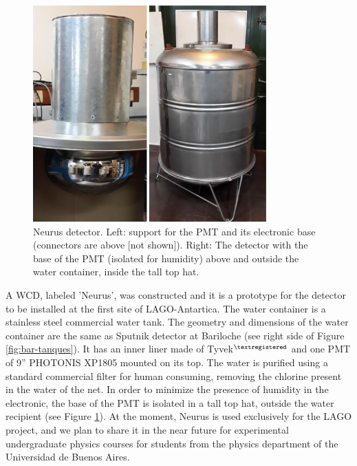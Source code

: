 \begin{figure}[h!]
\begin{center}
\includegraphics[width=0.8\textwidth]{images/argentina/neurus.png}
\caption{Neurus detector. Left: support for the PMT and its electronic base
(connectors are above [not shown]). Right: The detector with the base of the
PMT (isolated for humidity) above and outside the water container, inside the
tall top hat.}
\label{fig:neurus}
 \end{center}
\end{figure}

A WCD, labeled 'Neurus', was constructed and it is a prototype for the detector
to be installed at the first site of LAGO-Antartica.  The water container is a
stainless steel commercial water tank.  The geometry and dimensions of the
water container are the same as Sputnik detector at Bariloche (see right side
of Figure \ref{fig:bar-tanques}).  It has an inner liner made of
Tyvek$^{\textregistered}$ and one PMT of 9'' PHOTONIS XP1805 mounted on its top.
The water is purified using a standard commercial filter for human consuming,
removing the chlorine present in the water of the net.  In order to minimize
the presence of humidity in the electronic, the base of the PMT is isolated in
a tall top hat, outside the water recipient (see Figure \ref{fig:neurus}). At
the moment, Neurus is used exclusively for the LAGO project, and we plan to
share it in the near future for experimental undergraduate physics courses for
students from the physics department of the Universidad de Buenos Aires.

\label{sec:antartica}

